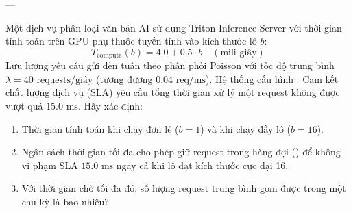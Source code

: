 ---

\begin{example}
Một dịch vụ phân loại văn bản AI sử dụng Triton Inference Server với thời gian tính toán trên GPU phụ thuộc tuyến tính vào kích thước lô $b$:
\begin{equation*}
T_{\text{compute}}(b) = 4.0 + 0.5 \cdot b \quad (\text{mili-giây})
\end{equation*}
Lưu lượng yêu cầu gửi đến tuân theo phân phối Poisson với tốc độ trung bình $\lambda = 40\text{ requests/giây}$ (tương đương $0.04\text{ req/ms}$).
Hệ thống cấu hình .
Cam kết chất lượng dịch vụ (SLA) yêu cầu tổng thời gian xử lý một request không được vượt quá $15.0\text{ ms}$.
Hãy xác định:
\begin{enumerate}
  \item Thời gian tính toán khi chạy đơn lẻ ($b=1$) và khi chạy đầy lô ($b=16$).
  \item Ngân sách thời gian tối đa cho phép giữ request trong hàng đợi () để không vi phạm SLA $15.0\text{ ms}$ ngay cả khi lô đạt kích thước cực đại 16.
  \item Với thời gian chờ tối đa đó, số lượng request trung bình gom được trong một chu kỳ là bao nhiêu?
\end{enumerate}
\end{example}


